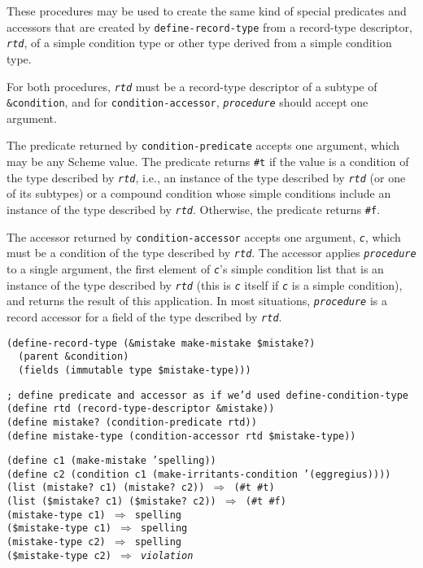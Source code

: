 These procedures may be used to create the same kind of special predicates
and accessors that are created by \texttt{define-record-type} from a
record-type descriptor, \texttt{\textit{rtd}}, of a simple condition type or other
type derived from a simple condition type.


For both procedures, \texttt{\textit{rtd}} must be a record-type descriptor of a
subtype of \texttt{\&{}condition}, and for \texttt{condition-accessor},
\texttt{\textit{procedure}} should accept one argument.


The predicate returned by \texttt{condition-predicate} accepts one
argument, which may be any Scheme value.
The predicate returns \texttt{\#{}t} if the value is a condition of the type
described by \texttt{\textit{rtd}}, i.e., an instance of the type described by
\texttt{\textit{rtd}} (or one of its subtypes) or a compound condition whose simple
conditions include an instance of the type described by \texttt{\textit{rtd}}.
Otherwise, the predicate returns \texttt{\#{}f}.


The accessor returned by \texttt{condition-accessor} accepts one argument,
\texttt{\textit{c}}, which must be a condition of the type described by \texttt{\textit{rtd}}.
The accessor applies \texttt{\textit{procedure}} to a single argument, the first element
of \texttt{\textit{c}}'s simple condition list that is an instance of the type
described by \texttt{\textit{rtd}} (this is \texttt{\textit{c}} itself if \texttt{\textit{c}} is a simple
condition), and returns the result of this application.
In most situations, \texttt{\textit{procedure}} is a record accessor for a field of the
type described by \texttt{\textit{rtd}}.


\begin{alltt}
(define-record-type (\&{}mistake make-mistake \${}mistake?)
  (parent \&{}condition)
  (fields (immutable type \${}mistake-type)))

; define predicate and accessor as if we'd used define-condition-type
(define rtd (record-type-descriptor \&{}mistake))
(define mistake? (condition-predicate rtd))
(define mistake-type (condition-accessor rtd \${}mistake-type))

(define c1 (make-mistake 'spelling))
(define c2 (condition c1 (make-irritants-condition '(eggregius))))
(list (mistake? c1) (mistake? c2)) \(\Rightarrow\) (\#{}t \#{}t)
(list (\${}mistake? c1) (\${}mistake? c2)) \(\Rightarrow\) (\#{}t \#{}f)
(mistake-type c1) \(\Rightarrow\) spelling
(\${}mistake-type c1) \(\Rightarrow\) spelling
(mistake-type c2) \(\Rightarrow\) spelling
(\${}mistake-type c2) \(\Rightarrow\) \textit{violation}
\end{alltt}

